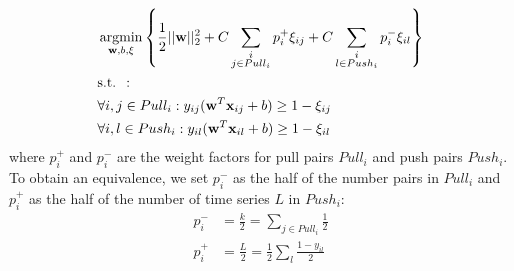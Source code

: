 \begin{equation}
\begin{aligned}
&\displaystyle \argmin_{\textbf{w},b,\xi} 
\left\lbrace \frac{1}{2}||\textbf{w}||_2^2
+ C \sum\limits_{\substack{i \\j \in Pull_i}}p_i^+\xi_{ij}
+ C \sum\limits_{\substack{i \\l \in Push_i}}p_i^-\xi_{il} \right\rbrace \\
& \text{s.t.  }: \\
& \forall i,j \in Pull_i: y_{ij}(\textbf{w}^T\textbf{x}_{ij}+b) \geq 1-\xi_{ij}\\
& \forall i,l \in Push_i: y_{il}(\textbf{w}^T\textbf{x}_{il}+b) \geq 1-\xi_{il}\\
\end{aligned}
\label{eq:SVMSofMarginProblem1}
\end{equation}
\noindent where $p_i^+$ and $p_i^-$ are the weight factors for pull pairs $Pull_i$ and push pairs $Push_i$. To obtain an equivalence, we set $p_i^-$ as the half of the number pairs in $Pull_i$ and $p_i^+$ as the half of the number of time series $L$ in $Push_i$:
\begin{align}
	p_i^- &= \frac{k}{2} = \sum_{j \in Pull_i} \frac{1}{2} \label{eq:pi_plus}\\
	p_i^+ &= \frac{L}{2} = \frac{1}{2}\sum_l \frac{1-y_{il}}{2} \label{eq:pi_moins}
\end{align}

